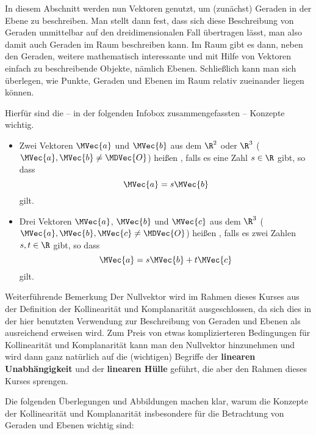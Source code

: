 \begin{MIntro}
In diesem Abschnitt werden nun Vektoren genutzt, um (zunächst) Geraden in der Ebene zu beschreiben. Man stellt dann fest, dass sich diese Beschreibung von Geraden unmittelbar auf den dreidimensionalen Fall übertragen lässt, man also damit auch Geraden im Raum beschreiben kann. Im Raum gibt es dann, neben den Geraden, weitere mathematisch interessante und mit Hilfe von Vektoren einfach zu beschreibende Objekte, nämlich Ebenen. Schließlich kann man sich überlegen, wie Punkte, Geraden und Ebenen im Raum relativ zueinander liegen können.

Hierfür sind die -- in der folgenden Infobox zusammengefassten -- Konzepte wichtig.

\begin{MInfo}
\begin{itemize}
 \item Zwei Vektoren $\MVec{a}$ und $\MVec{b}$ aus dem $\R^2$ oder $\R^3$ ($\MVec{a},\MVec{b}\neq\MDVec{O}$) heißen , falls es eine Zahl $s\in\R$ gibt, so dass 
 \[
  \MVec{a}=s\MVec{b}
 \]
 gilt.
 \item Drei Vektoren $\MVec{a}$, $\MVec{b}$ und $\MVec{c}$ aus dem $\R^3$ ($\MVec{a},\MVec{b},\MVec{c}\neq\MDVec{O}$) heißen , falls  es zwei Zahlen $s,t\in\R$ gibt, so dass
 \[
  \MVec{a}=s\MVec{b}+t\MVec{c}
 \]
 gilt.
\end{itemize}
\end{MInfo}

\begin{MHint}{Weiterführende Bemerkung}
Der Nullvektor wird im Rahmen dieses Kurses aus der Definition der Kollinearität und Komplanarität ausgeschlossen, da sich dies in der hier benutzten Verwendung zur Beschreibung von Geraden und Ebenen als ausreichend erweisen wird. Zum Preis von etwas komplizierteren Bedingungen für Kollinearität und Komplanarität kann man den Nullvektor hinzunehmen und wird dann ganz natürlich auf die (wichtigen) Begriffe der \textbf{linearen Unabhängigkeit} und der \textbf{linearen Hülle} geführt, die aber den Rahmen dieses Kurses sprengen.   
\end{MHint}


Die folgenden Überlegungen und Abbildungen machen klar, warum die Konzepte der Kollinearität und Komplanarität insbesondere für die Betrachtung von Geraden und Ebenen wichtig sind: 


\end{MIntro}
